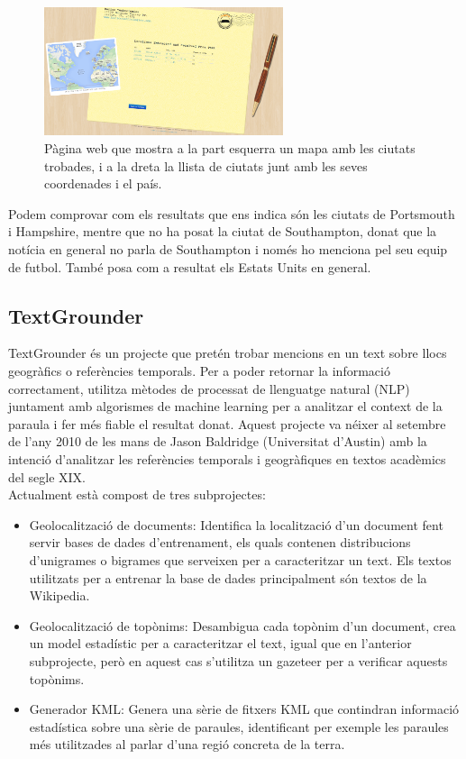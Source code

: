 \documentclass[12pt,a4paper,openright,oneside]{article}
\numberwithin{equation}{section}
\theoremstyle{definition}
\begin{document}
\begin{figure}[htbp]
\centering
\includegraphics[width=7cm]{clavin-2.png}
\caption{Pàgina web que mostra a la part esquerra un mapa amb les ciutats trobades, i a la dreta la llista de ciutats junt amb les seves coordenades i el país.}
\end{figure}Podem comprovar com els resultats que ens indica són les ciutats de Portsmouth i Hampshire, mentre que no ha posat la ciutat de Southampton, donat que la notícia en general no parla de Southampton i només ho menciona pel seu equip de futbol. També posa com a resultat els Estats Units en general.
\newpage
\subsection*{TextGrounder}
TextGrounder és un projecte que pretén trobar mencions en un text sobre llocs geogràfics o referències temporals. Per a poder retornar la informació correctament, utilitza mètodes de processat de llenguatge natural (NLP) juntament amb algorismes de machine learning per a analitzar el context de la paraula i fer més fiable el resultat donat.
Aquest projecte va néixer al setembre de l'any 2010 de les mans de Jason Baldridge (Universitat d'Austin) amb la intenció d'analitzar les referències temporals i geogràfiques en textos acadèmics del segle XIX.\\
Actualment està compost de tres subprojectes:
\begin{itemize}
\item Geolocalització de documents: Identifica la localització d'un document fent servir bases de dades d'entrenament, els quals contenen distribucions d'unigrames o bigrames que serveixen per a caracteritzar un text. Els textos utilitzats per a entrenar la base de dades principalment són textos de la Wikipedia.
\item Geolocalització de topònims: Desambigua cada topònim d'un document, crea un model estadístic per a caracteritzar el text, igual que en l'anterior subprojecte, però en aquest cas s'utilitza un gazeteer per a verificar aquests topònims.
\item Generador KML: Genera una sèrie de fitxers KML que contindran informació estadística sobre una sèrie de paraules, identificant per exemple les paraules més utilitzades al parlar d'una regió concreta de la terra.
\end{itemize}
\end{document}
